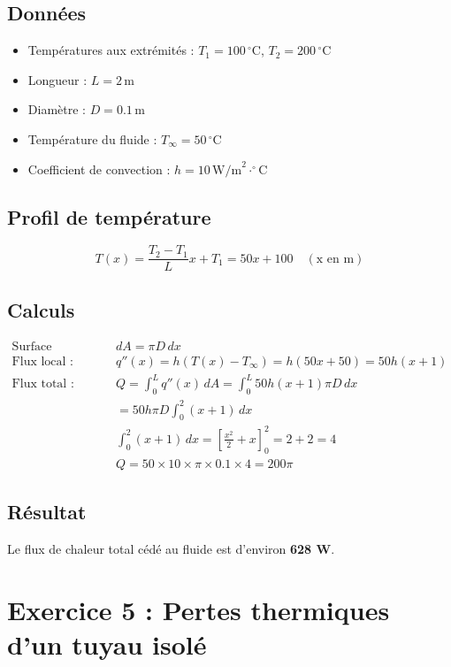 \documentclass{rapportECL}
\begin{document}
\subsection*{Données}
\begin{itemize}
    \item Températures aux extrémités : \( T_1 = 100 \, ^\circ \text{C} \), \( T_2 = 200 \, ^\circ \text{C} \)
    \item Longueur : \( L = 2 \, \text{m} \)
    \item Diamètre : \( D = 0.1 \, \text{m} \)
    \item Température du fluide : \( T_{\infty} = 50 \, ^\circ \text{C} \)
    \item Coefficient de convection : \( h = 10 \, \text{W/m}^2 \cdot ^\circ \text{C} \)
\end{itemize}

\subsection*{Profil de température}
\[
T(x) = \frac{T_2 - T_1}{L} x + T_1 = 50x + 100 \quad (\text{x en m})
\]

\subsection*{Calculs}
\begin{align*}
\text{Surface différentielle : } & dA = \pi D \, dx \\
\text{Flux local : } & q''(x) = h (T(x) - T_{\infty}) = h (50x + 50) = 50h (x+1) \\
\text{Flux total : } & Q = \int_0^L q''(x) \, dA = \int_0^L 50h (x+1) \pi D \, dx \\
& = 50h \pi D \int_0^2 (x+1) \, dx \\
& \int_0^2 (x+1) \, dx = \left[ \frac{x^2}{2} + x \right]_0^2 = 2 + 2 = 4 \\
& Q = 50 \times 10 \times \pi \times 0.1 \times 4 = 200 \pi
\end{align*}

\subsection*{Résultat}
Le flux de chaleur total cédé au fluide est d'environ \textbf{628 W}.

\section{Exercice 5 : Pertes thermiques d'un tuyau isolé}
\end{document}
